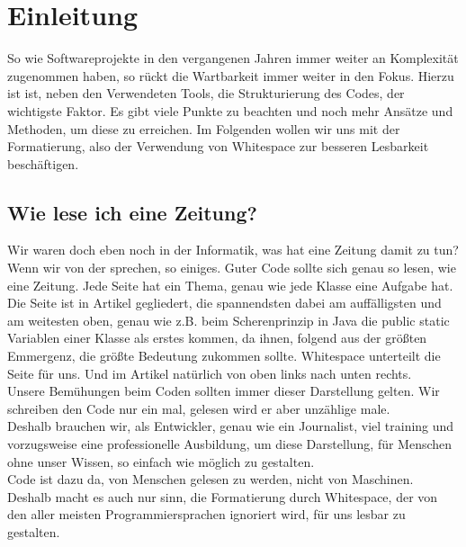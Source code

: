 \section{Einleitung}
	So wie Softwareprojekte in den vergangenen Jahren immer weiter an Komplexität zugenommen haben, so rückt die Wartbarkeit immer weiter in den Fokus.
	Hierzu ist ist, neben den Verwendeten Tools, die  Strukturierung des Codes, der wichtigste Faktor.
	Es gibt viele Punkte zu beachten und noch mehr Ansätze und Methoden, um diese zu erreichen.
	Im Folgenden wollen wir uns mit der Formatierung, also der Verwendung von Whitespace zur besseren Lesbarkeit beschäftigen.
	\subsection{Wie lese ich eine Zeitung?}
		Wir waren doch eben noch in der Informatik, was hat eine Zeitung damit zu tun?\\
		Wenn wir von der  sprechen, so einiges.
		Guter Code sollte sich genau so lesen, wie eine Zeitung.
		Jede Seite hat ein Thema, genau wie jede Klasse eine Aufgabe hat.
		Die Seite ist in Artikel gegliedert, die spannendsten dabei am auffälligsten und am weitesten oben, genau wie z.B. beim Scherenprinzip in Java die public static Variablen einer Klasse als erstes kommen, da ihnen, folgend aus der größten Emmergenz, die größte Bedeutung zukommen sollte.
		Whitespace unterteilt die Seite für uns.
		Und im Artikel natürlich von oben links nach unten rechts.\\
		Unsere Bemühungen beim Coden sollten immer dieser Darstellung gelten.
		Wir schreiben den Code nur ein mal, gelesen wird er aber unzählige male.\\
		Deshalb brauchen wir, als Entwickler, genau wie ein Journalist, viel training und vorzugsweise eine professionelle Ausbildung, um diese Darstellung, für Menschen ohne unser Wissen, so einfach wie möglich zu gestalten.\\
		Code ist dazu da, von Menschen gelesen zu werden, nicht von Maschinen.
		Deshalb macht es auch nur sinn, die Formatierung durch Whitespace, der von den aller meisten Programmiersprachen ignoriert wird, für uns lesbar zu gestalten.

